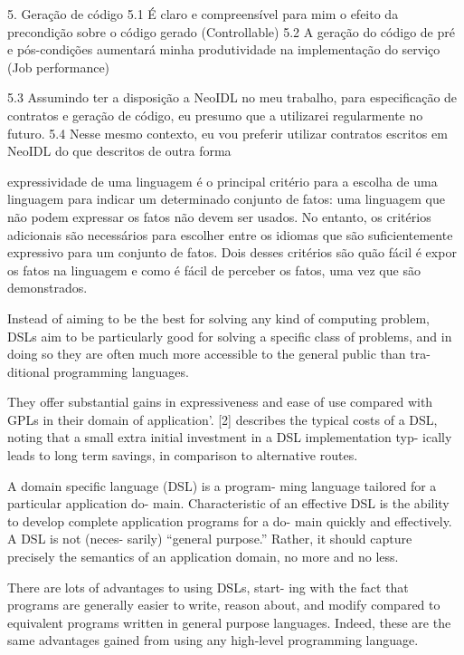 5. Geração de código
5.1 É claro e compreensível para mim o efeito da precondição sobre o código
gerado  (Controllable)
5.2 A geração do código de pré e pós-condições aumentará minha produtividade na
implementação do serviço (Job performance)

5.3 Assumindo ter a disposição a NeoIDL no meu trabalho, para especificação de
contratos e geração de código, eu presumo que a utilizarei regularmente no futuro.
5.4 Nesse mesmo contexto, eu vou preferir utilizar contratos escritos em NeoIDL
do que descritos de outra forma



expressividade de uma linguagem é o principal critério para a escolha de uma
linguagem para indicar um determinado conjunto de fatos: uma linguagem que não
podem expressar os fatos não devem ser usados. No entanto, os critérios
adicionais são necessários para escolher entre os idiomas que são
suficientemente expressivo para um conjunto de fatos. Dois desses critérios são
quão fácil é expor os fatos na linguagem e como é fácil de perceber os fatos,
uma vez que são demonstrados.

\cite{mackinlay1985expressiveness}



Instead of aiming to be the best for solving any kind of
computing problem, DSLs aim to be particularly good for
solving a specific class of problems, and in doing so they
are often much more accessible to the general public than tra-
ditional programming languages.
\cite{taha2008domain}

They offer substantial gains in expressiveness and ease of use compared
with GPLs in their domain of application’. [2] describes the typical costs of a
DSL, noting that a small extra initial investment in a DSL implementation typ-
ically leads to long term savings, in comparison to alternative routes.
\cite{tratt2008evolving}

A domain specific language (DSL) is a program-
ming language tailored for a particular application do-
main. Characteristic of an effective DSL is the ability
to develop complete application programs for a do-
main quickly and effectively. A DSL is not (neces-
sarily) “general purpose.” Rather, it should capture
precisely the semantics of an application domain, no
more and no less.

There are lots of advantages to using DSLs, start-
ing with the fact that programs are generally easier to
write, reason about, and modify compared to equivalent 
programs written in general purpose languages.
Indeed, these are the same advantages gained from using any high-level
programming language.
\cite{hudak1998modular}

